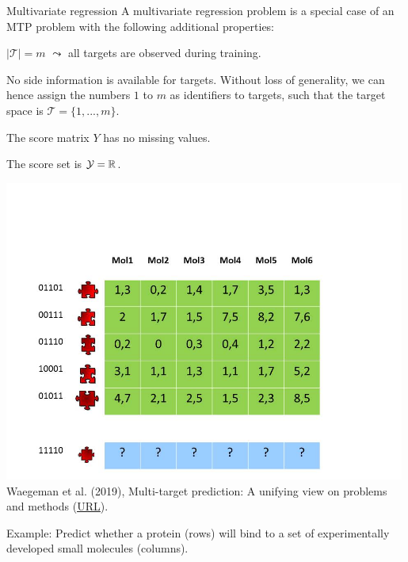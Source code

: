 \documentclass[11pt,compress,t,notes=noshow, xcolor=table]{beamer}
\newcommand{\Tspace}{\mathcal{T}}
\begin{document}
\begin{frame}{Multivariate regression}
	\small
% 
		A multivariate regression problem is a special case of an MTP problem with the following additional properties: 
%		
		\begin{enumerate}\small
%			
			\item[P5] $|\Tspace|=m$ $\leadsto$ all targets are observed during training. 
%			
			\item[P6] No side information is available for targets. Without loss of generality, we can hence assign the numbers $1$ to $m$ as identifiers to targets, such that the target space is $\Tspace = \{1,...,m\}$. 
%			
			
			\begin{minipage}{0.45\textwidth}    
%				
			\item[P7] The score matrix $Y$ has no missing values. 
%			
			\item[P8a] The score set is $\mathcal{Y} = \mathbb{R}$. 
%			
				\end{minipage}
			\begin{minipage}{0.45\textwidth}    
				\begin{center}
				\includegraphics[width=0.99\textwidth,trim = 0 0 100 100,clip]{figure/Slide1} 	\tiny
				\\ Waegeman et al. (2019), Multi-target prediction:
				A unifying view on problems and methods (\href{https://arxiv.org/pdf/1809.02352.pdf}{\underline{URL}}).
					\end{center}
			\end{minipage}
		\end{enumerate}
%	
	Example: Predict whether a protein (rows) will bind to a set of experimentally developed small molecules (columns).
%
\end{frame}
\end{document}
